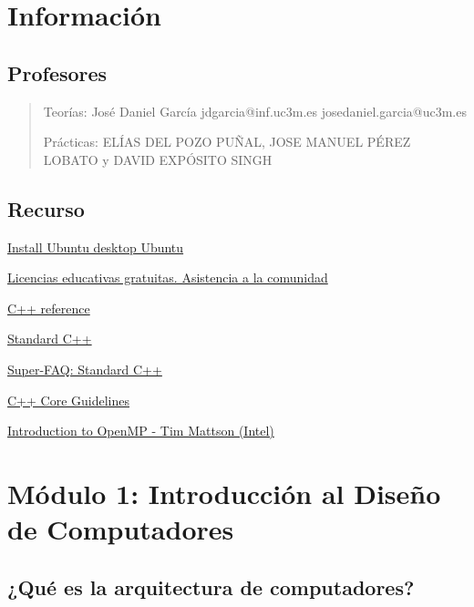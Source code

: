 \documentclass[12pt, twoside, openright]{report} %
\begin{document}
\listoffigures
\thispagestyle{fancy}





\chapter{Información}
\section{Profesores}
\begin{quote}
  Teorías: José Daniel García jdgarcia@inf.uc3m.es
  josedaniel.garcia@uc3m.es 
  
  Prácticas: ELÍAS DEL POZO PUÑAL, JOSE MANUEL
  PÉREZ LOBATO y DAVID EXPÓSITO SINGH
\end{quote}

\section{Recurso}
\href{https://ubuntu.com/tutorials/install-ubuntu-desktop\#1-overview}{Install
Ubuntu desktop \textbar{} Ubuntu}

\href{https://www.jetbrains.com/es-es/community/education/\#students}{Licencias
educativas gratuitas. Asistencia a la comunidad}

\href{https://en.cppreference.com/w/cpp}{C++ reference}

\href{https://isocpp.org/}{Standard C++}

\href{https://isocpp.org/faq}{Super-FAQ: Standard C++}

\href{http://isocpp.github.io/CppCoreGuidelines/CppCoreGuidelines}{C++
Core Guidelines}

\href{https://www.youtube.com/playlist?list=PLLX-Q6B8xqZ8n8bwjGdzBJ25X2utwnoEG}{Introduction
to OpenMP - Tim Mattson (Intel)}

\chapter{Módulo 1: Introducción al Diseño de Computadores}

\section{¿Qué es la arquitectura de computadores?}
\end{document}
